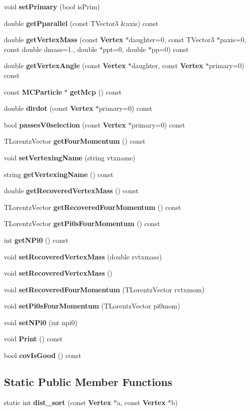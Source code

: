 \begin{DoxyCompactItemize}
void {\bf set\-Primary} (bool is\-Prim)
\item 
double {\bf get\-Pparallel} (const T\-Vector3 \&axis) const 
\item 
double {\bf get\-Vertex\-Mass} (const {\bf Vertex} $\ast$daughter=0, const T\-Vector3 $\ast$paxis=0, const double dmass=1., double $\ast$ppt=0, double $\ast$pp=0) const 
\item 
double {\bf get\-Vertex\-Angle} (const {\bf Vertex} $\ast$daughter, const {\bf Vertex} $\ast$primary=0) const 
\item 
const {\bf M\-C\-Particle} $\ast$ {\bf get\-Mcp} () const 
\item 
double {\bf dirdot} (const {\bf Vertex} $\ast$primary=0) const 
\item 
bool {\bf passes\-V0selection} (const {\bf Vertex} $\ast$primary=0) const 
\item 
T\-Lorentz\-Vector {\bf get\-Four\-Momentum} () const 
\item 
void {\bf set\-Vertexing\-Name} (string vtxname)
\item 
string {\bf get\-Vertexing\-Name} () const 
\item 
double {\bf get\-Recovered\-Vertex\-Mass} () const 
\item 
T\-Lorentz\-Vector {\bf get\-Recovered\-Four\-Momentum} () const 
\item 
T\-Lorentz\-Vector {\bf get\-Pi0s\-Four\-Momentum} () const 
\item 
int {\bf get\-N\-Pi0} () const 
\item 
void {\bf set\-Recovered\-Vertex\-Mass} (double rvtxmass)
\item 
void {\bf set\-Recovered\-Vertex\-Mass} ()
\item 
void {\bf set\-Recovered\-Four\-Momentum} (T\-Lorentz\-Vector rvtxmom)
\item 
void {\bf set\-Pi0s\-Four\-Momentum} (T\-Lorentz\-Vector pi0mom)
\item 
void {\bf set\-N\-Pi0} (int npi0)
\item 
void {\bf Print} () const 
\item 
bool {\bf cov\-Is\-Good} () const 
\end{DoxyCompactItemize}
\subsection*{Static Public Member Functions}
\begin{DoxyCompactItemize}
\item 
static int {\bf dist\-\_\-sort} (const {\bf Vertex} $\ast$a, const {\bf Vertex} $\ast$b)
\end{DoxyCompactItemize}
